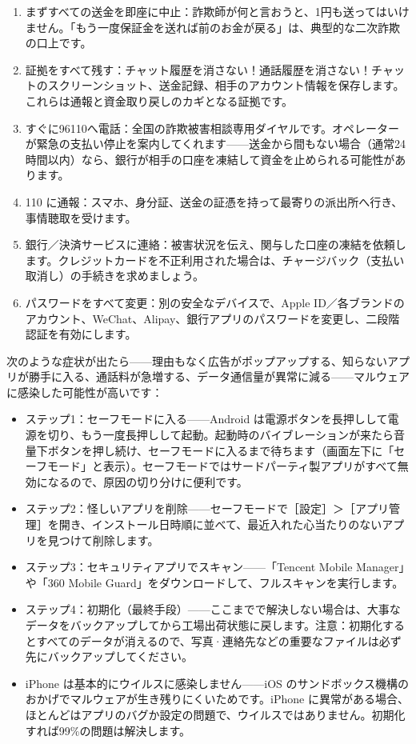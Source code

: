 \begin{enumerate}
  \item まずすべての送金を即座に中止：詐欺師が何と言おうと、1円も送ってはいけません。「もう一度保証金を送れば前のお金が戻る」は、典型的な二次詐欺の口上です。
  \item 証拠をすべて残す：チャット履歴を消さない！通話履歴を消さない！チャットのスクリーンショット、送金記録、相手のアカウント情報を保存します。これらは通報と資金取り戻しのカギとなる証拠です。
  \item すぐに96110へ電話：全国の詐欺被害相談専用ダイヤルです。オペレーターが緊急の支払い停止を案内してくれます——送金から間もない場合（通常24時間以内）なら、銀行が相手の口座を凍結して資金を止められる可能性があります。
  \item 110 に通報：スマホ、身分証、送金の証憑を持って最寄りの派出所へ行き、事情聴取を受けます。
  \item 銀行／決済サービスに連絡：被害状況を伝え、関与した口座の凍結を依頼します。クレジットカードを不正利用された場合は、チャージバック（支払い取消し）の手続きを求めましょう。
  \item パスワードをすべて変更：別の安全なデバイスで、Apple ID／各ブランドのアカウント、WeChat、Alipay、銀行アプリのパスワードを変更し、二段階認証を有効にします。
\end{enumerate}


次のような症状が出たら——理由もなく広告がポップアップする、知らないアプリが勝手に入る、通話料が急増する、データ通信量が異常に減る——マルウェアに感染した可能性が高いです：

\begin{itemize}
  \item ステップ1：セーフモードに入る——Android は電源ボタンを長押しして電源を切り、もう一度長押しして起動。起動時のバイブレーションが来たら音量下ボタンを押し続け、セーフモードに入るまで待ちます（画面左下に「セーフモード」と表示）。セーフモードではサードパーティ製アプリがすべて無効になるので、原因の切り分けに便利です。
  \item ステップ2：怪しいアプリを削除——セーフモードで［設定］＞［アプリ管理］を開き、インストール日時順に並べて、最近入れた心当たりのないアプリを見つけて削除します。
  \item ステップ3：セキュリティアプリでスキャン——「Tencent Mobile Manager」や「360 Mobile Guard」をダウンロードして、フルスキャンを実行します。
  \item ステップ4：初期化（最終手段）——ここまでで解決しない場合は、大事なデータをバックアップしてから工場出荷状態に戻します。注意：初期化するとすべてのデータが消えるので、写真·連絡先などの重要なファイルは必ず先にバックアップしてください。
  \item iPhone は基本的にウイルスに感染しません——iOS のサンドボックス機構のおかげでマルウェアが生き残りにくいためです。iPhone に異常がある場合、ほとんどはアプリのバグか設定の問題で、ウイルスではありません。初期化すれば99\%の問題は解決します。
\end{itemize}

